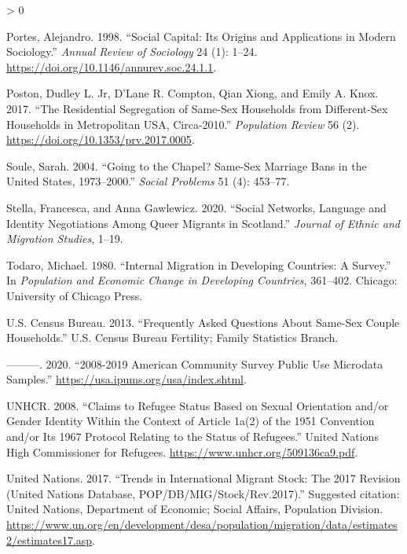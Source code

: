 \documentclass[
  11pt,
]{article}
\newlength{\cslhangindent}
\newenvironment{CSLReferences}[2] %
 {%
  \setlength{\parindent}{0pt}
  \ifodd #1 \everypar{\setlength{\hangindent}{\cslhangindent}}\ignorespaces\fi
  \ifnum #2 > 0
  \setlength{\parskip}{#2\baselineskip}
  \fi
 }%
 {}
\begin{document}
\begin{CSLReferences}{1}{0}
\leavevmode\hypertarget{ref-portes_1998}{}%
Portes, Alejandro. 1998. {``Social {Capital}: {Its} {Origins} and {Applications} in {Modern} {Sociology}.''} \emph{Annual Review of Sociology} 24 (1): 1--24. \url{https://doi.org/10.1146/annurev.soc.24.1.1}.

\leavevmode\hypertarget{ref-poston_2017}{}%
Poston, Dudley L. Jr, D'Lane R. Compton, Qian Xiong, and Emily A. Knox. 2017. {``The {Residential} {Segregation} of {Same}-{Sex} {Households} from {Different}-{Sex} {Households} in {Metropolitan} {USA}, Circa-2010.''} \emph{Population Review} 56 (2). \url{https://doi.org/10.1353/prv.2017.0005}.

\leavevmode\hypertarget{ref-soule_2004}{}%
Soule, Sarah. 2004. {``Going to the Chapel? {Same}-Sex Marriage Bans in the {United} {States}, 1973--2000.''} \emph{Social Problems} 51 (4): 453--77.

\leavevmode\hypertarget{ref-stella_2020}{}%
Stella, Francesca, and Anna Gawlewicz. 2020. {``Social Networks, Language and Identity Negotiations Among Queer Migrants in {Scotland}.''} \emph{Journal of Ethnic and Migration Studies}, 1--19.

\leavevmode\hypertarget{ref-todaro_1980}{}%
Todaro, Michael. 1980. {``Internal Migration in Developing Countries: A Survey.''} In \emph{Population and Economic Change in Developing Countries}, 361--402. Chicago: University of Chicago Press.

\leavevmode\hypertarget{ref-u.s.censusbureau_2013}{}%
U.S. Census Bureau. 2013. {``Frequently {Asked} {Questions} {About} {Same}-{Sex} {Couple} {Households}.''} U.S. Census Bureau Fertility; Family Statistics Branch.

\leavevmode\hypertarget{ref-u.s.censusbureau_2020}{}%
---------. 2020. {``2008-2019 {American} {Community} {Survey} {Public} {Use} {Microdata} {Samples}.''} \url{https://usa.ipums.org/usa/index.shtml}.

\leavevmode\hypertarget{ref-unhcr_2008}{}%
UNHCR. 2008. {``Claims to {Refugee} {Status} Based on {Sexual} {Orientation} and/or {Gender} {Identity} Within the Context of {Article} {1a}(2) of the 1951 {Convention} and/or Its 1967 {Protocol} Relating to the {Status} of {Refugees}.''} United Nations High Commissioner for Refugees. \url{https://www.unhcr.org/509136ca9.pdf}.

\leavevmode\hypertarget{ref-unitednations_2017}{}%
United Nations. 2017. {``Trends in {International} {Migrant} {Stock}: {The} 2017 {Revision} ({United} {Nations} Database, {POP}/{DB}/{MIG}/{Stock}/{Rev}.2017).''} Suggested citation: United Nations, Department of Economic; Social Affairs, Population Division. \url{https://www.un.org/en/development/desa/population/migration/data/estimates2/estimates17.asp}.


\end{CSLReferences}
\end{document}
